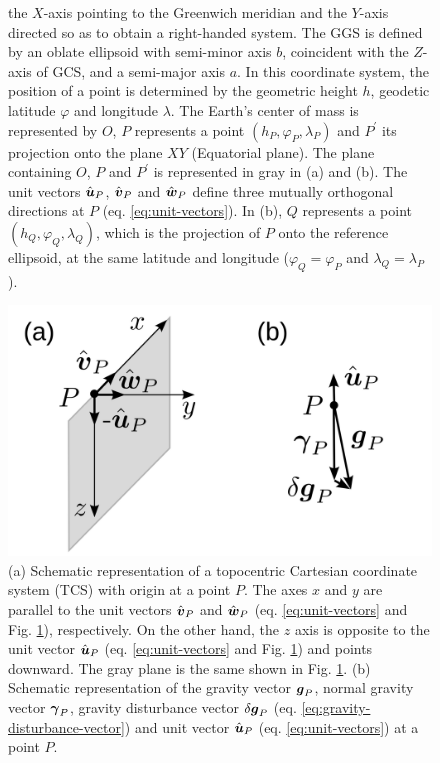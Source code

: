 \documentclass[extra]{gji}
\begin{document}
\begin{figure}
{    the $X$-axis pointing to the Greenwich meridian and the $Y$-axis
    directed so as to obtain a right-handed system. The GGS is      defined by an oblate ellipsoid with semi-minor axis $b$, 
    coincident with the $Z$-axis of GCS, and a semi-major
    axis $a$. In this coordinate system, the position of a point is
    determined by the geometric height $h$, geodetic latitude 
    $\varphi$ and longitude $\lambda$. 
    The Earth's center of mass is represented 
    by $O$, $P$ represents a point $(h_{P}, \varphi_{P}, \lambda_{P})$ and $P^{\prime}$ its projection onto the plane $XY$ 
    (Equatorial plane). The plane containing $O$, $P$ and 
    $P^{\prime}$ is represented in gray in (a) and (b). 
    The unit vectors $\hat{\mitbf{u}}_{P}$, $\hat{\mitbf{v}}_{P}$ and 
    $\hat{\mitbf{w}}_{P}$ define three mutually orthogonal 
    directions at $P$ (eq. \ref{eq:unit-vectors}).
    In (b), $Q$ represents a point $(h_{Q}, \varphi_{Q}, \lambda_{Q})$,
    which is the projection of $P$ onto the reference ellipsoid, at
    the same latitude and longitude ($\varphi_{Q} = \varphi_{P}$ and $\lambda_{Q} = \lambda_{P}$).}
  \label{fig:GCS-GGS}
\end{figure}

\begin{figure}
    \includegraphics{figures/local-system.png}
    \caption{(a) Schematic representation of a topocentric Cartesian 
    coordinate system (TCS) with origin at a point $P$. The axes $x$
    and $y$ are parallel to the unit vectors $\hat{\mitbf{v}}_{P}$
    and $\hat{\mitbf{w}}_{P}$ (eq. \ref{eq:unit-vectors} and
    Fig. \ref{fig:GCS-GGS}), respectively. On the other hand, the $z$ axis is opposite to the unit vector $\hat{\mitbf{u}}_{P}$ (eq. 
    \ref{eq:unit-vectors} and Fig. \ref{fig:GCS-GGS}) and points downward. The gray plane is the same shown in Fig. \ref{fig:GCS-GGS}.
    (b) Schematic representation of the gravity vector
    $\mitbf{g}_{P}$, normal gravity vector $\mitbf{\gamma}_{P}$,
    gravity disturbance vector $\delta \mitbf{g}_{P}$
    (eq. \ref{eq:gravity-disturbance-vector}) and unit vector 
    $\hat{\mitbf{u}}_{P}$ (eq. \ref{eq:unit-vectors}) at a point 
    $P$.}
  \label{fig:TCS}
\end{figure}
\end{document}
